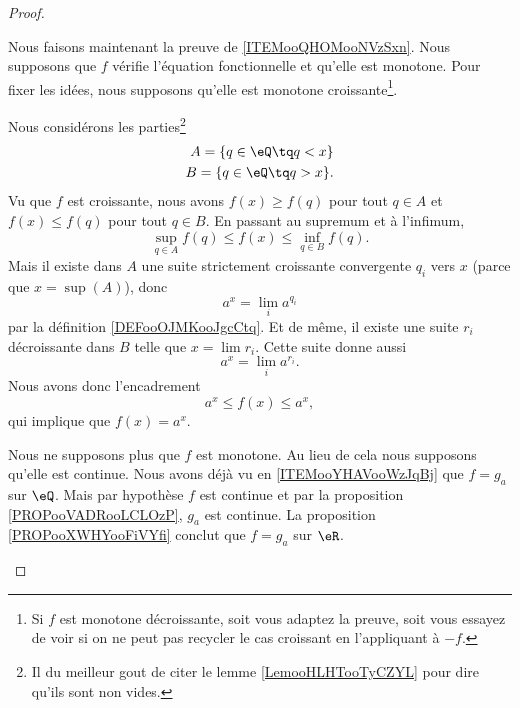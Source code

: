 \begin{proof}
	\begin{subproof}
		Nous faisons maintenant la preuve de \ref{ITEMooQHOMooNVzSxn}. Nous supposons que \( f\) vérifie l'équation fonctionnelle et qu'elle est monotone. Pour fixer les idées, nous supposons qu'elle est monotone croissante\footnote{Si \( f\) est monotone décroissante, soit vous adaptez la preuve, soit vous essayez de voir si on ne peut pas recycler le cas croissant en l'appliquant à \( -f\).}.

		Nous considérons les parties\footnote{Il du meilleur gout de citer le lemme \ref{LemooHLHTooTyCZYL} pour dire qu'ils sont non vides.}
		\begin{subequations}
			\begin{align}
				A=\{ q\in \eQ\tq q<x \} \\
				B=\{ q\in \eQ\tq q>x \}.
			\end{align}
		\end{subequations}
		Vu que \( f\) est croissante, nous avons \( f(x)\geq f(q)\) pour tout \( q\in A\) et \( f(x)\leq f(q)\) pour tout \( q\in B\). En passant au supremum et à l'infimum,
		\begin{equation}
			\sup_{q\in A}f(q)\leq f(x)\leq \inf_{q\in B}f(q).
		\end{equation}
		Mais il existe dans \( A\) une suite strictement croissante convergente \( q_i\) vers \( x\) (parce que \( x=\sup(A)\)), donc
		\begin{equation}
			a^x=\lim_ia^{q_i}
		\end{equation}
		par la définition \ref{DEFooOJMKooJgcCtq}. Et de même, il existe une suite \( r_i\) décroissante dans \( B\) telle que \( x=\lim r_i\). Cette suite donne aussi
		\begin{equation}
			a^x=\lim_i a^{r_i}.
		\end{equation}
		Nous avons donc l'encadrement
		\begin{equation}
			a^x\leq f(x)\leq a^x,
		\end{equation}
		qui implique que \( f(x)=a^x\).


		Nous ne supposons plus que \( f\) est monotone. Au lieu de cela nous supposons qu'elle est continue. Nous avons déjà vu en \ref{ITEMooYHAVooWzJqBj} que \( f=g_a\) sur \( \eQ\). Mais par hypothèse \( f\) est continue et par la proposition \ref{PROPooVADRooLCLOzP}, \( g_a\) est continue. La proposition \ref{PROPooXWHYooFiVYfi} conclut que \( f=g_a\) sur \( \eR\).
	\end{subproof}
\end{proof}

